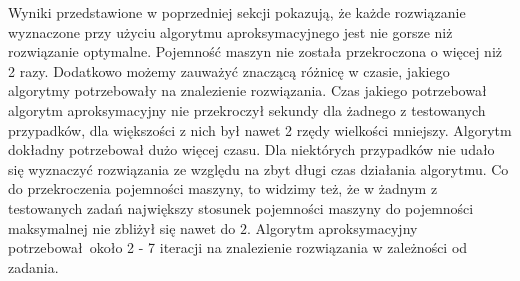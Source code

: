 \documentclass{article}
\begin{document}
    Wyniki przedstawione w poprzedniej sekcji pokazują, że każde rozwiązanie wyznaczone przy użyciu algorytmu aproksymacyjnego jest 
    nie gorsze niż rozwiązanie optymalne. Pojemność maszyn nie została przekroczona o więcej niż 2 razy. Dodatkowo możemy zauważyć 
    znaczącą różnicę w czasie, jakiego algorytmy potrzebowały na znalezienie rozwiązania. Czas jakiego potrzebował algorytm aproksymacyjny 
    nie przekroczył sekundy dla żadnego z testowanych przypadków, dla większości z nich był nawet 2 rzędy wielkości mniejszy. 
    Algorytm dokładny potrzebował dużo więcej czasu. Dla niektórych przypadków nie udało się wyznaczyć rozwiązania ze względu na zbyt długi czas 
    działania algorytmu. Co do przekroczenia pojemności maszyny, to widzimy też, że w żadnym z testowanych zadań największy stosunek pojemności 
    maszyny do pojemności maksymalnej nie zbliżył się nawet do $2$. Algorytm aproksymacyjny potrzebował około 2 - 7 iteracji na 
    znalezienie rozwiązania w zależności od zadania. 
\end{document}
